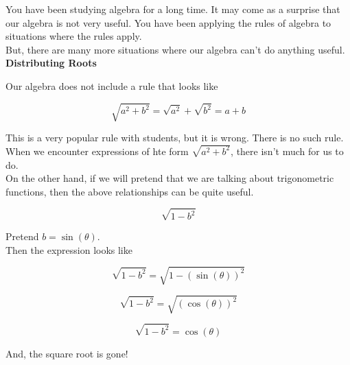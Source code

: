 \documentclass{ximera}
\begin{document}
You have been studying algebra for a long time.  It may come as a surprise that our algebra is not very useful.  You have been applying the rules of algebra to situations where the rules apply. \\


But, there are many more situations where our algebra can't do anything useful. \\



\textbf{Distributing Roots}


Our algebra does not include a rule that looks like  

\[
\sqrt{a^2 + b^2} = \sqrt{a^2} + \sqrt{b^2} = a + b
\]


This is a very popular rule with students, but it is wrong.  There is no such rule. \\


When we encounter expressions of hte form $\sqrt{a^2 + b^2}$, there isn't much for us to do. \\



On the other hand, if we will pretend that we are talking about trigonometric functions, then the above relationships can be quite useful. \\




\begin{example}


\[
\sqrt{1 - b^2} 
\]


Pretend $b = \sin(\theta)$. \\

Then the expression looks like

\[
\sqrt{1 - b^2} = \sqrt{1 - (\sin(\theta))^2}
\]


\[
\sqrt{1 - b^2} = \sqrt{(\cos(\theta))^2}
\]


\[
\sqrt{1 - b^2} = \cos(\theta)
\]



And, the square root is gone! \\





\end{example}
\end{document}
